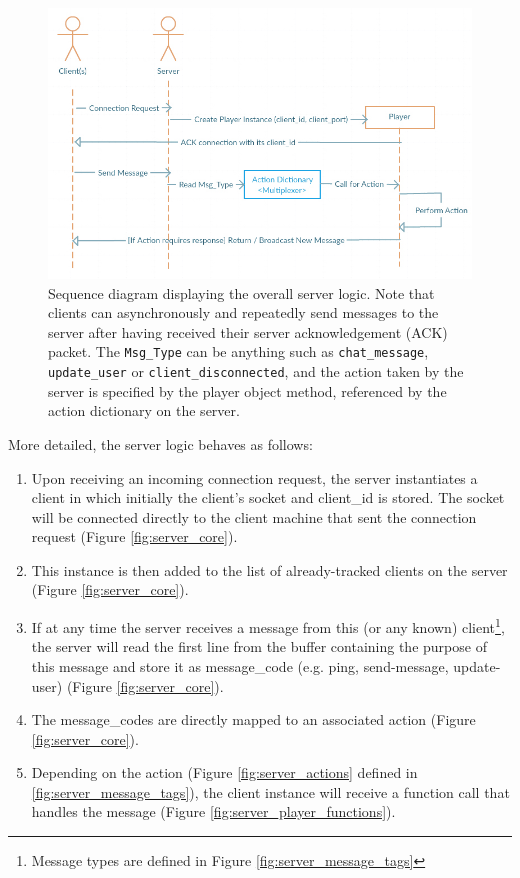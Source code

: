 \documentclass[bsc, 12pt, twoside, singlespacing, parskip, abbrevs, notimes, normalheadings, logo]{styles/infthesis}
\begin{document}
\begin{figure}[H]
\includegraphics[scale=0.56]{images/server_sequence_diagram.jpg}
\caption{Sequence diagram displaying the overall server logic. Note that clients can asynchronously and repeatedly send messages to the server after having received their server acknowledgement (ACK) packet. The \texttt{Msg\_Type} can be anything such as \texttt{chat\_message}, \texttt{update\_user} or \texttt{client\_disconnected}, and the action taken by the server is specified by the player object method, referenced by the action dictionary on the server.}
\label{fig:server_sequence_diagram}
\end{figure}
More detailed, the server logic behaves as follows:
\begin{enumerate}
\item Upon receiving an incoming connection request, the server instantiates a client in which initially the client's socket and client\_id is stored. The socket will be connected directly to the client machine that sent the connection request (Figure \ref{fig:server_core}).
\item This instance is then added to the list of already-tracked clients on the server (Figure \ref{fig:server_core}).
\item If at any time the server receives a message from this (or any known) client\footnote{Message types are defined in Figure \ref{fig:server_message_tags}}, the server will read the first line from the buffer containing the purpose of this message and store it as message\_code (e.g. ping, send-message, update-user) (Figure \ref{fig:server_core}).
\item The message\_codes are directly mapped to an associated action (Figure \ref{fig:server_core}).
\item Depending on the action (Figure \ref{fig:server_actions} defined in \ref{fig:server_message_tags}), the client instance will receive a function call that handles the message (Figure \ref{fig:server_player_functions}).
\end{enumerate}
\end{document}

